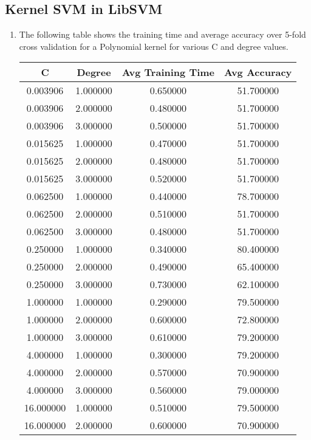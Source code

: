 \documentclass[12pt]{article}
\begin{document}
\subsection{Kernel SVM in LibSVM}
\begin{enumerate}[label=\alph*.]
	\item The following table shows the training time and average accuracy over 5-fold cross validation for a Polynomial kernel for various C and degree values.
	\begin{longtable}{| c | c | c | c |} 
		\hline
	    	C & Degree & Avg Training Time & Avg Accuracy \\
		\hline \hline
		0.003906 & 1.000000 & 0.650000 & 51.700000 \\
		\hline
		0.003906 & 2.000000 & 0.480000 & 51.700000 \\
		\hline
		0.003906 & 3.000000 & 0.500000 & 51.700000 \\
		\hline
		0.015625 & 1.000000 & 0.470000 & 51.700000 \\
		\hline
		0.015625 & 2.000000 & 0.480000 & 51.700000 \\
		\hline
		0.015625 & 3.000000 & 0.520000 & 51.700000 \\
		\hline
		0.062500 & 1.000000 & 0.440000 & 78.700000 \\
		\hline
		0.062500 & 2.000000 & 0.510000 & 51.700000 \\
		\hline
		0.062500 & 3.000000 & 0.480000 & 51.700000 \\
		\hline
		0.250000 & 1.000000 & 0.340000 & 80.400000 \\
		\hline
		0.250000 & 2.000000 & 0.490000 & 65.400000 \\
		\hline
		0.250000 & 3.000000 & 0.730000 & 62.100000 \\
		\hline
		1.000000 & 1.000000 & 0.290000 & 79.500000 \\
		\hline
		1.000000 & 2.000000 & 0.600000 & 72.800000 \\
		\hline
		1.000000 & 3.000000 & 0.610000 & 79.200000 \\
		\hline
		4.000000 & 1.000000 & 0.300000 & 79.200000 \\
		\hline
		4.000000 & 2.000000 & 0.570000 & 70.900000 \\
		\hline
		4.000000 & 3.000000 & 0.560000 & 79.000000 \\
		\hline
		16.000000 & 1.000000 & 0.510000 & 79.500000 \\
		\hline
		16.000000 & 2.000000 & 0.600000 & 70.900000 \\
		\hline

\end{longtable}
\end{enumerate}
\end{document}
